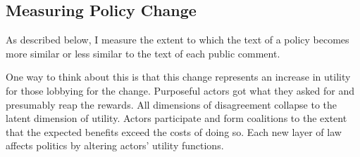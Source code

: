 




\subsection{Measuring Policy Change}

As described below, I measure the extent to which the text of a policy becomes more similar or less similar to the text of each public comment. 

One way to think about this is that this change represents an increase in utility for those lobbying for the change. Purposeful actors got what they asked for and presumably reap the rewards. All dimensions of disagreement collapse to the latent dimension of utility. Actors participate and form coalitions to the extent that the expected benefits exceed the costs of doing so. Each new layer of law affects politics by altering actors' utility functions. 

